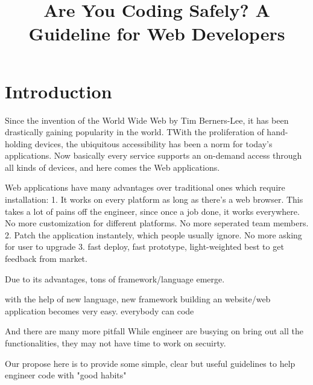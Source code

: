 \documentclass[conference]{IEEEtran}
\begin{document}
\title{Are You Coding Safely? A Guideline for Web Developers}

\author{
\and
{}
}





\maketitle

\section{Introduction}
Since the invention of the World Wide Web by Tim Berners-Lee, it has been drastically gaining popularity in the world. TWith the proliferation of hand-holding devices, the ubiquitous accessibility has been a norm for today's applications. Now basically every service supports an on-demand access through all kinds of devices, and here comes the Web applications.

Web applications have many advantages over traditional ones which require installation: 1. It works on every platform as long as there's a web browser. This takes a lot of pains off the engineer, since once a job done, it works everywhere. No more customization for different platforms. No more seperated team members. 2. Patch the application instantely, which people usually ignore. No more asking for user to upgrade 3. fast deploy, fast prototype, light-weighted best to get feedback from market.

Due to its advantages, tons of framework/language emerge.

with the help of new language, new framework building an website/web application becomes very easy. everybody can code

And there are many more pitfall While engineer are busying on bring out all the functionalities, they may not have time to work on secuirty.

Our propose here is to provide some simple, clear but useful guidelines to help engineer code with "good habits"
\end{document}
